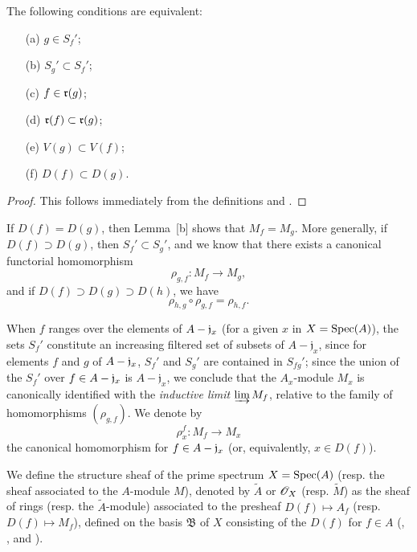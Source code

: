 \begin{lemma}[1.3.2]
\label{I.1.3.2}
The following conditions are equivalent:
\begin{enumerate}
  \item[{\rm(a)}] $g\in S_f'$;
  \item[{\rm(b)}] $S_g'\subset S_f'$;
  \item[{\rm(c)}] $f\in\mathfrak{r}(g)$;
  \item[{\rm(d)}] $\mathfrak{r}(f)\subset\mathfrak{r}(g)$;
  \item[{\rm(e)}] $V(g)\subset V(f)$;
  \item[{\rm(f)}] $D(f)\subset D(g)$.
\end{enumerate}
\end{lemma}

\begin{proof}
This follows immediately from the definitions and .
\end{proof}

\begin{env}[1.3.3]
\label{I.1.3.3}
If $D(f)=D(g)$, then Lemma~[b] shows that $M_f=M_g$.
More generally, if $D(f)\supset D(g)$, then $S_f'\subset S_g'$, and we know  that there exists a canonical functorial homomorphism
\[
  \rho_{g,f}:M_f\to M_g,
\]
and if $D(f)\supset D(g)\supset D(h)$, we have 
\[
  \rho_{h,g}\circ\rho_{g,f}=\rho_{h,f}.
  \tag{1.3.3.1}
\]
\end{env}

When $f$ ranges over the elements of $A-\mathfrak{j}_x$ (for a given $x$ in $X=\operatorname{Spec}(A)$), the sets $S_f'$ constitute an increasing filtered set of subsets of $A-\mathfrak{j}_x$, since for elements $f$ and $g$ of $A-\mathfrak{j}_x$, $S_f'$ and $S_g'$ are contained in $S_{fg}'$;
since the union of the $S_f'$ over $f\in A-\mathfrak{j}_x$ is $A-\mathfrak{j}_x$, we conclude  that the $A_x$-module $M_x$ is canonically identified with the \emph{inductive limit} $\varinjlim M_f$, relative to the family of homomorphisms $(\rho_{g,f})$.
We denote by
\[
  \rho_x^f:M_f\to M_x
\]
the canonical homomorphism for $f\in A-\mathfrak{j}_x$ (or, equivalently, $x\in D(f)$).

\begin{definition}[1.3.4]
\label{I.1.3.4}
We define the structure sheaf of the prime spectrum $X=\operatorname{Spec}(A)$ (resp. the sheaf associated to the $A$-module $M$), denoted by $\widetilde{A}$ or $\mathscr{O}_X$ (resp. $\widetilde{M}$) as the sheaf of rings (resp. the $\widetilde{A}$-module) associated to the presheaf $D(f)\mapsto A_f$ (resp. $D(f)\mapsto M_f$), defined on the basis $\mathfrak{B}$ of $X$ consisting of the $D(f)$ for $f\in A$ (, , and ).
\end{definition}

